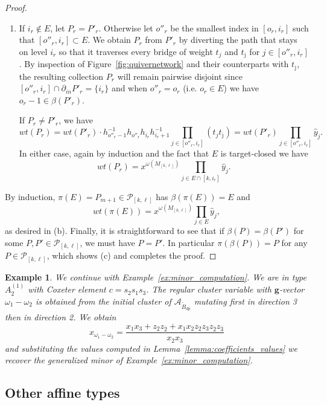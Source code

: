 \documentclass[12pt]{amsart}
\newcommand{\cA}{\mathcal{A}}
\newcommand{\bfg}{\mathbf{g}}
\newcommand{\gv}{\omega}
\newcommand{\grep}{\gv}
\newcommand{\cP}{\mathcal{P}}
\newcommand{\ol}[1]{\overline{#1}}
\newcommand{\Bdp}{\widetilde{B}_{dp}}
\newcommand{\Qrep}{M}
\newcommand{\cvar}{z}
\newtheorem{example}[theorem]{Example}
\theoremstyle{remark}
\numberwithin{equation}{section}
\numberwithin{figure}{section}
\begin{document}
\begin{proof}
\begin{enumerate}
    \item
      If $i_r \notin E$, let $P_r = P'_r$.
      Otherwise let $o''_r$ be the smallest index in $[o_r,i_r]$ such that $[o''_r,i_r]\subset E$.
      We obtain $P_r$ from $P'_r$ by diverting the path that stays on level $i_r$ so that it traverses every bridge of weight $t_j$ and $t_{\ol{\jmath}}$ for $j\in[o''_r,i_r]$.
      By inspection of Figure~\ref{fig:quivernetwork} and their counterparts with $t_{\ol{\jmath}}$, the resulting collection $P_r$ will remain pairwise disjoint since $[o''_r,i_r]\cap\partial_{in}P'_r=\{i_r\}$ and when $o''_r=o_r$ (i.e. $o_r\in E$) we have $o_r-1\in\beta(P'_r)$.

      If $P_r \neq P'_r$, we have
      \[
        wt(P_r)=wt(P'_r)\cdot h_{o''_r-1}^{-1}h_{o''_r}h_{i_r}h_{i_r+1}^{-1}\prod_{j\in[o''_r,i_r]}(t_jt_{\ol{\jmath}})=wt(P'_r)\prod_{j \in [o''_r,i_r]} \hat{y}_j.
      \]
      In either case, again by induction and the fact that $E$ is target-closed we have
      \[
        wt(P_r) = x^{\grep(\Qrep_{[k,\ell]})} \prod_{j \in E \cap [k,i_r]} \hat{y}_j.
      \]
  \end{enumerate}
  By induction, $\pi(E)=P_{m+1} \in \cP_{[k,\ell]}$ has $\beta(\pi(E))=E$ and
  \[
    wt(\pi(E))=x^{\grep(\Qrep_{[k,\ell]})}\prod_{j\in E}\hat y_j,
  \]
  as desired in (b).
  Finally, it is straightforward to see that if $\beta(P) = \beta(P')$ for some $P, P' \in \cP_{[k,\ell]}$, we must have $P = P'$.
  In particular $\pi(\beta(P))=P$ for any $P\in\cP_{[k,\ell]}$, which shows (c) and completes the proof.
\end{proof}
\begin{example}
  We continue with Example~\ref{ex:minor_computation}.
  We are in type $A_2^{(1)}$ with Coxeter element $c=s_2s_1s_3$.
  The regular cluster variable with $\bfg$-vector $\omega_1-\omega_2$ is obtained from the initial cluster of $\cA_{\Bdp}$ mutating first in direction 3 then in direction 2.
  We obtain
  \[
    x_{\omega_1-\omega_2} 
    =
    \frac{x_1 x_3 + \cvar_2 \cvar_{\ol{2}} + x_1 x_2 \cvar_2 \cvar_3 \cvar_{\ol{2}} \cvar_{\ol{3}}}{x_2 x_3}
  \]
  and substituting the values computed in Lemma~\ref{lemma:coefficients_values} we recover the generalized minor of Example~\ref{ex:minor_computation}.
\end{example}
\subsection{Other affine types}
\label{sec:othertypes}
\end{document}

